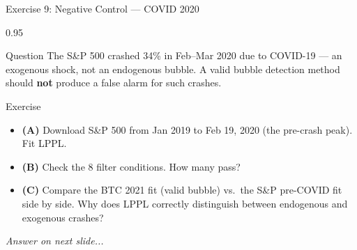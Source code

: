 \documentclass[9pt, aspectratio=169, t]{beamer}
\begin{document}
\begin{frame}{Exercise 9: Negative Control --- COVID 2020}
    \begin{cminipage}{0.95\textwidth}
    \begin{alertblock}{Question}
        The S\&P 500 crashed 34\% in Feb--Mar 2020 due to COVID-19 --- an exogenous shock, not an endogenous bubble.
        A valid bubble detection method should \textbf{not} produce a false alarm for such crashes.
    \end{alertblock}

    \vspace{0.15cm}

    \begin{block}{Exercise}
        \begin{itemize}\setlength{\itemsep}{3pt}
            \item \textcolor{MainBlue}{\textbf{(A)}} Download S\&P 500 from Jan 2019 to Feb 19, 2020 (the pre-crash peak). Fit LPPL.
            \item \textcolor{MainBlue}{\textbf{(B)}} Check the 8 filter conditions. How many pass?
            \item \textcolor{MainBlue}{\textbf{(C)}} Compare the BTC 2021 fit (valid bubble) vs.\ the S\&P pre-COVID fit side by side. Why does LPPL correctly distinguish between endogenous and exogenous crashes?
        \end{itemize}
    \end{block}

    \vspace{0.1cm}

    \begin{center}
        \textit{Answer on next slide...}
    \end{center}
    \end{cminipage}
\end{frame}
\end{document}
